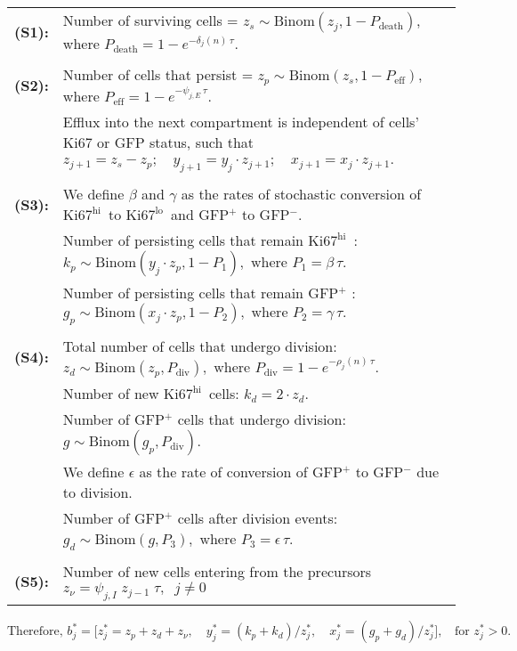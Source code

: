 \documentclass[11pt]{article}
\newcommand{\khi}{\ensuremath{\text{Ki67}^\text{hi}}~}
\newcommand{\klo}{\ensuremath{\text{Ki67}^\text{lo}}~}
\begin{document}
\begin{mybox}
\begin{tabular}{ll}
\\
    \textbf{(S1):} &Number of surviving cells =  $z_{s} \sim \text{Binom}(z_j, 1-P_\text{death})$, where $P_\text{death}= 1 - e^{-\delta_{j}(n) \, \tau}$. \\
    \\
    \textbf{(S2):} &Number of cells that persist = $z_{p} \sim \text{Binom}(z_s, 1- P_\text{eff})$, where $P_\text{eff}= 1 - e^{-\psi_{j, E} \, \tau}$. \\
    & Efflux into the next compartment is independent of cells' Ki67 or GFP status, such that \\
    & $ z_{j+1} = z_{s} - z_{p}; \quad y_{j+1} = y_j  \cdot z_{j+1}; \quad x_{j+1} = x_j \cdot z_{j+1}.$\\
    \\
    \textbf{(S3):}  & We define $\beta$ and $\gamma$ as the rates of stochastic conversion of \khi to \klo and GFP$^+$ to GFP$^-$. \\ %
    & Number of persisting cells that remain \khi:  $k_{p} \sim \text{Binom}(y_j  \cdot z_{p},  1-P_{1}), \text{ where }P_1 = \beta \, \tau.$ \\
    & Number of persisting cells that remain GFP$^+$ : $g_{p} \sim \text{Binom}(x_j  \cdot z_{p},  1-P_{2}),  \text{ where }P_2 = \gamma \, \tau.$ \\
    \\
    \textbf{(S4):}  & Total number of cells that undergo division: $z_{d} \sim \text{Binom}(z_{p} , P_\text{div}), \text{ where } P_\text{div}= 1 - e^{-\rho_{j}(n) \, \tau}.$ \\
    & Number of new \khi cells: $k_d = 2 \cdot z_{d}$. \\
    & Number of GFP$^+$ cells that undergo division: $g \sim \text{Binom}(g_{p}, P_\text{div})$. \\
    & We define $\epsilon$ as the rate of conversion of GFP$^+$ to GFP$^-$ due to division.\\
    & Number of GFP$^+$ cells after division events: $g_{d} \sim \text{Binom}(g,  P_3), \text{ where } P_3 = \epsilon \, \tau$.\\ 
    \\
    \textbf{(S5):}  &Number of new cells entering from the precursors $z_{\nu} =  \psi_{j, I} \; z_{j-1} \; \tau,  \;\; j\neq0$ \\
\end{tabular}


$$\text{Therefore, } b_j^* = \big[ z_{j}^* = z_{p} + z_{d} + z_{\nu}, \quad y_j^* = (k_{p} + k_{d})/z_{j}^*, \quad x_j^* = (g_{p} + g_{d})/z_{j}^* \big], \;\; \text{ for } z_{j}^*>0.$$

\end{mybox}
\end{document}
